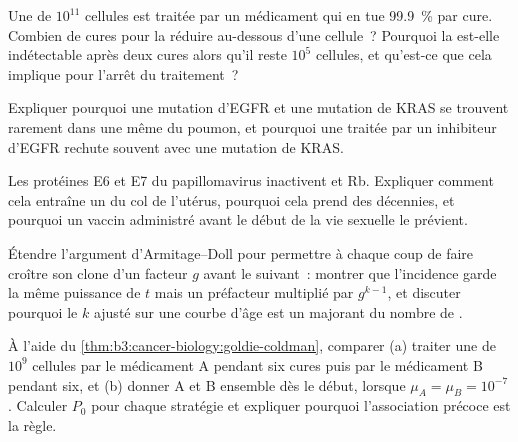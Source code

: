 \begin{exercise}[$\star\star$]\label{exo:b3:cancer-biology:7}
Une  de $10^{11}$ cellules est traitée par un médicament qui en
tue \qty{99.9}{\%} par cure. Combien de cures pour la réduire au-dessous
d'une cellule~? Pourquoi la  est-elle indétectable après deux
cures alors qu'il reste $10^{5}$ cellules, et qu'est-ce que cela
implique pour l'arrêt du traitement~?
\end{exercise}

\begin{exercise}[$\star\star$]\label{exo:b3:cancer-biology:8}
Expliquer pourquoi une mutation d'EGFR et une mutation de KRAS se
trouvent rarement dans une même  du poumon, et pourquoi une
 traitée par un inhibiteur d'EGFR rechute souvent avec une
mutation de KRAS.
\end{exercise}

\begin{exercise}[$\star\star$]\label{exo:b3:cancer-biology:9}
Les protéines E6 et E7 du papillomavirus inactivent  et Rb.
Expliquer comment cela entraîne un  du col de l'utérus, pourquoi
cela prend des décennies, et pourquoi un vaccin administré avant le
début de la vie sexuelle le prévient.
\end{exercise}

\begin{exercise}[$\star\star\star$]\label{exo:b3:cancer-biology:10}
Étendre l'argument d'Armitage--Doll pour permettre à chaque coup de
faire croître son clone d'un facteur $g$ avant le suivant~: montrer que
l'incidence garde la même puissance de $t$ mais un préfacteur multiplié
par $g^{k-1}$, et discuter pourquoi le $k$ ajusté sur une courbe d'âge
est un majorant du nombre de .
\end{exercise}

\begin{exercise}[$\star\star\star$]\label{exo:b3:cancer-biology:11}
À l'aide du \cref{thm:b3:cancer-biology:goldie-coldman}, comparer
(a) traiter une  de $10^{9}$ cellules par le médicament A pendant
six cures puis par le médicament B pendant six, et (b) donner A et B
ensemble dès le début, lorsque $\mu_{A} =
\mu_{B} = 10^{-7}$. Calculer $P_{0}$ pour chaque stratégie et expliquer
pourquoi l'association précoce est la règle.
\end{exercise}

